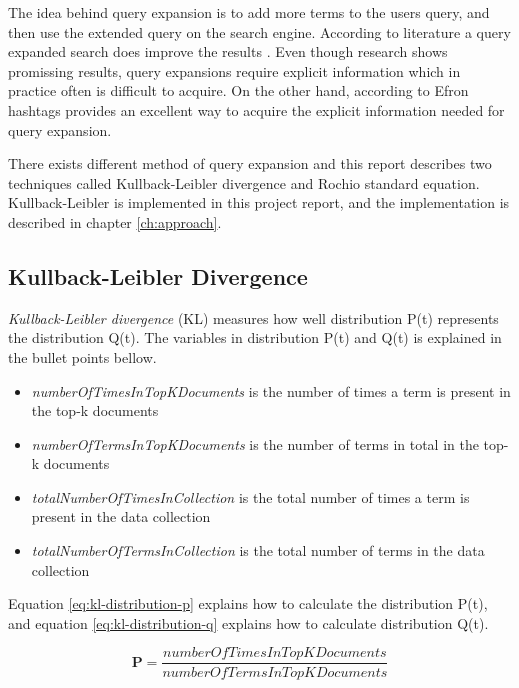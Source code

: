 The idea behind query expansion is to add more terms to the users query, and then use the extended query on the search engine.
According to literature a query expanded search does improve the results \cite[ch. 5]{ir-book}.
Even though research shows promissing results, query expansions require explicit information which in practice often is difficult to acquire.
On the other hand, according to Efron \cite{ir-hashtag} hashtags provides an excellent way to acquire the explicit information needed for query expansion.

There exists different method of query expansion and this report describes two techniques called Kullback-Leibler divergence and Rochio standard equation.
Kullback-Leibler is implemented in this project report, and the implementation is described in chapter \ref{ch:approach}.

\subsection{Kullback-Leibler Divergence}
\textit{Kullback-Leibler divergence} (KL) measures how well distribution P(t) represents the distribution Q(t).
The variables in distribution P(t) and Q(t) is explained in the bullet points bellow.

\begin{itemize}
	\item \textit{numberOfTimesInTopKDocuments} is the number of times a term is present in the top-k documents
	\item \textit{numberOfTermsInTopKDocuments} is the number of terms in total in the top-k documents
	\item \textit{totalNumberOfTimesInCollection} is the total number of times a term is present in the data collection
	\item \textit{totalNumberOfTermsInCollection} is the total number of terms in the data collection
\end{itemize}

Equation \ref{eq:kl-distribution-p} explains how to calculate the distribution P(t),
and equation \ref{eq:kl-distribution-q} explains how to calculate distribution Q(t).

\begin{cequation}[H]
	\begin{equation}
		\mathbf{P} = \frac{numberOfTimesInTopKDocuments}{numberOfTermsInTopKDocuments}
	\end{equation}
	\caption{}
  \label{eq:kl-distribution-p}
\end{cequation}

